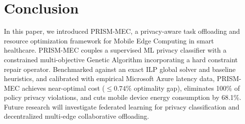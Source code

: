 \documentclass[conference]{IEEEtran}
\begin{document}
\section{Conclusion}
In this paper, we introduced PRISM-MEC, a privacy-aware task offloading and resource optimization framework for Mobile Edge Computing in smart healthcare. PRISM-MEC couples a supervised ML privacy classifier with a constrained multi-objective Genetic Algorithm incorporating a hard constraint repair operator. Benchmarked against an exact ILP global solver and baseline heuristics, and calibrated with empirical Microsoft Azure latency data, PRISM-MEC achieves near-optimal cost ($\le 0.74\%$ optimality gap), eliminates 100\% of policy privacy violations, and cuts mobile device energy consumption by 68.1\%. Future research will investigate federated learning for privacy classification and decentralized multi-edge collaborative offloading.



\end{document}
